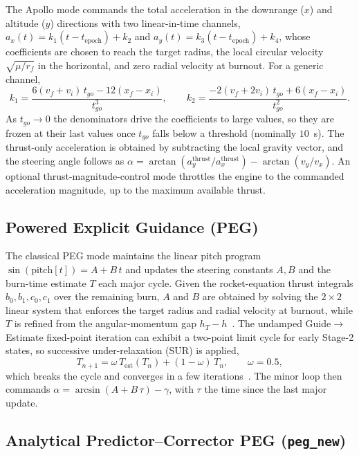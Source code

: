 The Apollo mode commands the total acceleration in the downrange ($x$) and
altitude ($y$) directions with two linear-in-time channels,
$a_x(t)=k_1(t-t_{\mathrm{epoch}})+k_2$ and
$a_y(t)=k_3(t-t_{\mathrm{epoch}})+k_4$, whose coefficients are chosen to reach
the target radius, the local circular velocity $\sqrt{\mu/r_f}$ in the horizontal,
and zero radial velocity at burnout. For a generic channel,
\begin{equation}
  k_1 = \frac{6(v_f+v_i)\,t_{go} - 12(x_f-x_i)}{t_{go}^{3}}, \qquad
  k_2 = \frac{-2(v_f+2v_i)\,t_{go} + 6(x_f-x_i)}{t_{go}^{2}}.
  \label{eq:apollo_k}
\end{equation}
As $t_{go}\to0$ the denominators drive the coefficients to large values, so they
are frozen at their last values once $t_{go}$ falls below a threshold (nominally
$10$~s). The thrust-only acceleration is obtained by subtracting the local gravity
vector, and the steering angle follows as
$\alpha=\arctan(a_y^{\mathrm{thrust}}/a_x^{\mathrm{thrust}})-\arctan(v_y/v_x)$. An
optional thrust-magnitude-control mode throttles the engine to the commanded
acceleration magnitude, up to the maximum available thrust.

\subsection{Powered Explicit Guidance (PEG)}
\label{ssec:peg}

The classical PEG mode maintains the linear pitch program
$\sin(\text{pitch}[t]) = A + B\,t$ and updates the steering constants $A,B$ and the
burn-time estimate $T$ each major cycle. Given the rocket-equation thrust
integrals $b_0,b_1,c_0,c_1$ over the remaining burn, $A$ and $B$ are obtained by
solving the $2\times2$ linear system that enforces the target radius and radial
velocity at burnout, while $T$ is refined from the angular-momentum gap
$h_T-h$~\cite{burden2015numerical}. The undamped Guide$\rightarrow$Estimate
fixed-point iteration can exhibit a two-point limit cycle for early Stage-2
states, so successive under-relaxation (SUR) is applied,
\begin{equation}
  T_{n+1} = \omega\,T_{\mathrm{est}}(T_n) + (1-\omega)\,T_n,
  \qquad \omega=0.5,
  \label{eq:peg_sur}
\end{equation}
which breaks the cycle and converges in a few iterations~\cite{burden2015numerical}.
The minor loop then commands $\alpha=\arcsin(A+B\,\tau)-\gamma$, with $\tau$ the
time since the last major update.

\subsection{Analytical Predictor--Corrector PEG (\texttt{peg\_new})}
\label{ssec:peg_new}

